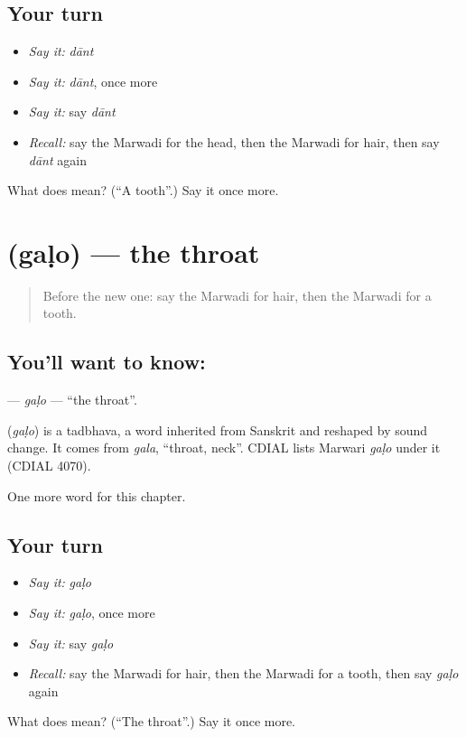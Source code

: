 \subsection*{Your turn}
\begin{itemize}
\raggedright
  \item \emph{Say it:} \emph{dānt}
  \item \emph{Say it:} \emph{dānt}, once more
  \item \emph{Say it:} say \emph{dānt}
  \item \emph{Recall:} say the Marwadi for the head, then the Marwadi for hair, then say \emph{dānt} again
\end{itemize}

\begin{tcolorbox}[breakable,colback=teal!4,colframe=teal!35!black,title={Before you move on}]
What does  mean? (\textquotedblleft{}A tooth\textquotedblright{}.) Say it once more.
\end{tcolorbox}
\section[\texorpdfstring{\mw{गळो} (gaḷo)}{गळो (gaḷo)}]{ (gaḷo) — the throat}

\label{lesson:MW-C44-galo}



\begin{quote}
Before the new one: say the Marwadi for hair, then the Marwadi for a tooth.
\end{quote}

\subsection*{You'll want to know: }
\textbf{} — \emph{gaḷo} — \textquotedblleft{}the throat\textquotedblright{}.

\begin{cousinweb}
\textbf{} (\emph{gaḷo}) is a tadbhava, a word inherited from Sanskrit and reshaped by sound change. It comes from \emph{gala}, \textquotedblleft{}throat, neck\textquotedblright{}. CDIAL lists Marwari \emph{gaḷo} under it (CDIAL 4070).
\end{cousinweb}

\begin{grammarlens}[title={What you've built}]
One more word for this chapter.
\end{grammarlens}

\subsection*{Your turn}
\begin{itemize}
\raggedright
  \item \emph{Say it:} \emph{gaḷo}
  \item \emph{Say it:} \emph{gaḷo}, once more
  \item \emph{Say it:} say \emph{gaḷo}
  \item \emph{Recall:} say the Marwadi for hair, then the Marwadi for a tooth, then say \emph{gaḷo} again
\end{itemize}

\begin{tcolorbox}[breakable,colback=teal!4,colframe=teal!35!black,title={Before you move on}]
What does  mean? (\textquotedblleft{}The throat\textquotedblright{}.) Say it once more.
\end{tcolorbox}
